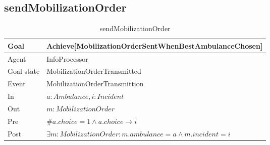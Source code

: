 \subsection{sendMobilizationOrder}
	\begin{table}[!h] \centering
		\begin{tabularx}{\textwidth}{|l|X|} \hline
			Goal & Achieve[MobilizationOrderSentWhenBestAmbulanceChosen] \\ \hline
			Agent & InfoProcessor \\ \hline
			Goal state & MobilizationOrderTransmitted \\ \hline
			Event & MobilizationOrderTransmittion \\ \hline
			In & $a: Ambulance, i: Incident$ \\ \hline
			Out & $m: MobilizationOrder$ \\ \hline
			Pre & $\#a.choice = 1 \wedge a.choice \rightarrow i$ \\ \hline
			Post & $\exists m: MobilizationOrder : m.ambulance = a \wedge m.incident = i$ \\ \hline
		\end{tabularx}
		\caption{sendMobilizationOrder}
	\end{table}
